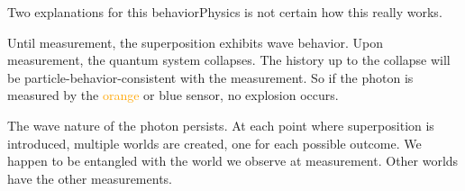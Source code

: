 \begin{frame}{Two explanations for this behavior}{Physics is not certain how this really works.}
  \begin{description}
     \item<1->[\href{https://en.wikipedia.org/wiki/Copenhagen_interpretation}{Copenhagen}] Until measurement, the superposition exhibits wave behavior.  Upon measurement, the quantum system collapses.  The history up to the collapse will be particle-behavior-consistent with the measurement.  So if the photon is measured by the \textcolor{orange}{orange} or
     \textcolor{NavyBlue}{blue} sensor, no explosion occurs.
     \item<2>[\href{https://en.wikipedia.org/wiki/Many-worlds_interpretation}{Many worlds}] The wave nature of the photon persists.  At each point where superposition is introduced, multiple worlds are created, one for each possible outcome.  We happen to be entangled with the world we observe at measurement.  Other worlds have the other measurements.
  \end{description}
  
\end{frame}

